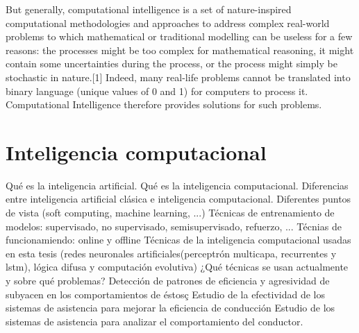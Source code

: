 But generally, computational intelligence is a set of nature-inspired computational methodologies and approaches to address complex real-world problems to which mathematical or traditional modelling can be useless for a few reasons: the processes might be too complex for mathematical reasoning, it might contain some uncertainties during the process, or the process might simply be stochastic in nature.[1] Indeed, many real-life problems cannot be translated into binary language (unique values of 0 and 1) for computers to process it. Computational Intelligence therefore provides solutions for such problems.



\section{Inteligencia computacional}

Qué es la inteligencia artificial. Qué es la inteligencia computacional.
Diferencias entre inteligencia artificial clásica e inteligencia computacional. Diferentes puntos de vista (soft computing, machine learning, ...)
Técnicas de entrenamiento de modelos: supervisado, no supervisado, semisupervisado, refuerzo, ...
Técnias de funcionamiendo: online y offline
Técnicas de la inteligencia computacional usadas en esta tesis (redes neuronales artificiales(perceptrón multicapa, recurrentes y lstm), lógica difusa y computación evolutiva)
¿Qué técnicas se usan actualmente y sobre qué problemas?
Detección de patrones de eficiencia y agresividad de subyacen en los comportamientos de éstosç
Estudio de la efectividad de los sistemas de asistencia para mejorar la eficiencia de conducción
Estudio de los sistemas de asistencia para analizar el comportamiento del conductor.